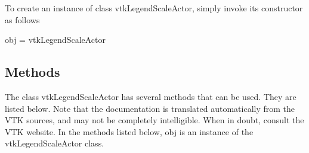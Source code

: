 To create an instance of class vtk\-Legend\-Scale\-Actor, simply invoke its constructor as follows \begin{DoxyVerb}  obj = vtkLegendScaleActor
\end{DoxyVerb}
 \hypertarget{vtkwidgets_vtkxyplotwidget_Methods}{}\subsection{Methods}\label{vtkwidgets_vtkxyplotwidget_Methods}
The class vtk\-Legend\-Scale\-Actor has several methods that can be used. They are listed below. Note that the documentation is translated automatically from the V\-T\-K sources, and may not be completely intelligible. When in doubt, consult the V\-T\-K website. In the methods listed below, {\ttfamily obj} is an instance of the vtk\-Legend\-Scale\-Actor class. 
